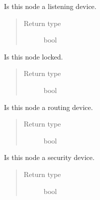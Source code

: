 \documentclass[letterpaper,10pt,english]{sphinxmanual}
\begin{document}
\begin{fulllineitems}
\begin{fulllineitems}
\label{node:openzwave.node.ZWaveNode.is_listening_device}
Is this node a listening device.
\begin{quote}\begin{description}
\item[{Return type}] \leavevmode
bool

\end{description}\end{quote}

\end{fulllineitems}


\begin{fulllineitems}
\label{node:openzwave.node.ZWaveNode.is_locked}
Is this node locked.
\begin{quote}\begin{description}
\item[{Return type}] \leavevmode
bool

\end{description}\end{quote}

\end{fulllineitems}


\begin{fulllineitems}
\label{node:openzwave.node.ZWaveNode.is_routing_device}
Is this node a routing device.
\begin{quote}\begin{description}
\item[{Return type}] \leavevmode
bool

\end{description}\end{quote}

\end{fulllineitems}


\begin{fulllineitems}
\label{node:openzwave.node.ZWaveNode.is_security_device}
Is this node a security device.
\begin{quote}\begin{description}
\item[{Return type}] \leavevmode
bool


\end{description}
\end{quote}
\end{fulllineitems}
\end{fulllineitems}
\end{document}
